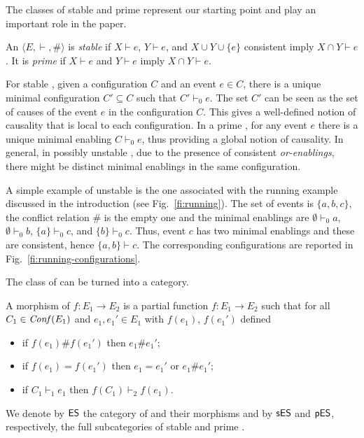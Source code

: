 The classes of stable and prime {\esabbr} represent our starting point and 
play an important role in the paper.

\begin{definition}
  \label{de:stable-prime-es}
  An {\esabbr} $\langle E, \vdash, \# \rangle$ is \emph{stable}
  if $X\vdash e$, $Y \vdash e$, and $X \cup Y \cup \{e\}$ consistent
  imply $X \cap Y \vdash e$.  It is \emph{prime} if $X\vdash e$ and
  $Y \vdash e$ imply $X \cap Y \vdash e$.
\end{definition}

For stable {\esabbr}, given a configuration $C$ and an event $e \in C$,
there is a unique minimal configuration $C' \subseteq C$ such that
$C' \vdash_0 e$.  The set $C'$ can be seen as the set of causes of
the event $e$ in the configuration $C$. This gives a well-defined notion of
causality that is local to each configuration. In a prime {\esabbr}, for any event $e$
there is a unique minimal enabling $C \vdash_0 e$, thus providing a
global notion of causality.
%
In general, in possibly unstable {\esabbr}, due to the presence of consistent
\emph{or-enablings}, there might be distinct minimal enablings in the
same configuration.

\begin{example}
  \label{ex:event-structure}
  A simple example of unstable {\esabbr} is the one associated with
  the running example discussed in the introduction (see
  Fig.~\ref{fi:running}). The set of events is $\{ a, b, c \}$, the
  conflict relation $\#$ is the empty one and the minimal enablings
  are $\emptyset \vdash_0 a$, $\emptyset \vdash_0 b$,
  $\{ a\} \vdash_0 c$, and $\{ b\} \vdash_0 c$. Thus, event $c$ has
  two minimal enablings and these are consistent, hence
  $ \{ a, b \} \vdash c$.  The corresponding configurations are
  reported in Fig.~\ref{fi:running-configurations}.
\end{example}


The class of {\esabbr} can be turned into a category.

\begin{definition}
  \label{de:es-morphism}
  A morphism of {\esabbr} $f : {E}_1 \to {E}_2$
  is a partial function $f : E_1 \to E_2$ such that for all
  $C_1 \in \mathit{Conf}({E_1})$ and $e_1, e_1' \in E_1$ with $f(e_1)$, $f(e_1')$ defined
  \begin{itemize}
  \item if $f(e_1) \# f(e_1')$ then $e_1 \# e_1'$;
  \item if $f(e_1) = f(e_1')$ then  $e_1 = e_1'$ or $e_1 \# e_1'$;
  \item if $C_1 \vdash_1 e_1$ then $f(C_1) \vdash_2 f(e_1)$.
  \end{itemize}
  We denote by $\mathsf{ES}$ the category of {\esabbr} and their
  morphisms and by $\mathsf{sES}$ and $\mathsf{pES}$, respectively, the full subcategories of stable and prime {\esabbr}.
\end{definition}



